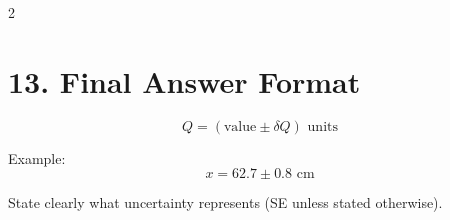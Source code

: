 \documentclass[10pt,landscape]{article}
\begin{document}
\begin{multicols}{2}
\section*{13. Final Answer Format}

\[
Q = (\text{value} \pm \delta Q)\text{ units}
\]

Example:
\[
x = 62.7 \pm 0.8 \text{ cm}
\]

State clearly what uncertainty represents (SE unless stated otherwise).


\end{multicols}
\end{document}
